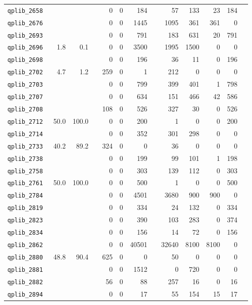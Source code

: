 {\begin{longtable}{lrrrrrrrrrrrr}
{\tt 	qplib\_2658	}	&		&		&	&	0	&	0	&	184	&	&	57	&	133	&	23	&	184	\\
{\tt 	qplib\_2676	}	&		&		&	&	0	&	0	&	1445	&	&	1095	&	361	&	361	&	0	\\
{\tt 	qplib\_2693	}	&		&		&	&	0	&	0	&	791	&	&	183	&	631	&	20	&	791	\\
{\tt 	qplib\_2696	}	&	1.8	&	0.1	&	&	0	&	0	&	3500	&	&	1995	&	1500	&	0	&	0	\\
{\tt 	qplib\_2698	}	&		&		&	&	0	&	0	&	196	&	&	36	&	11	&	0	&	196	\\
{\tt 	qplib\_2702	}	&	4.7	&	1.2	&	&	259	&	0	&	1	&	&	212	&	0	&	0	&	0	\\
{\tt 	qplib\_2703	}	&		&		&	&	0	&	0	&	799	&	&	399	&	401	&	1	&	798	\\
{\tt 	qplib\_2707	}	&		&		&	&	0	&	0	&	634	&	&	151	&	466	&	42	&	586	\\
{\tt 	qplib\_2708	}	&		&		&	&	108	&	0	&	526	&	&	327	&	30	&	0	&	526	\\
{\tt 	qplib\_2712	}	&	50.0	&	100.0	&	&	0	&	0	&	200	&	&	1	&	0	&	0	&	200	\\
{\tt 	qplib\_2714	}	&		&		&	&	0	&	0	&	352	&	&	301	&	298	&	0	&	0	\\
{\tt 	qplib\_2733	}	&	40.2	&	89.2	&	&	324	&	0	&	0	&	&	36	&	0	&	0	&	0	\\
{\tt 	qplib\_2738	}	&		&		&	&	0	&	0	&	199	&	&	99	&	101	&	1	&	198	\\
{\tt 	qplib\_2758	}	&		&		&	&	0	&	0	&	303	&	&	139	&	112	&	0	&	303	\\
{\tt 	qplib\_2761	}	&	50.0	&	100.0	&	&	0	&	0	&	500	&	&	1	&	0	&	0	&	500	\\
{\tt 	qplib\_2784	}	&		&		&	&	0	&	0	&	4501	&	&	3680	&	900	&	900	&	0	\\
{\tt 	qplib\_2819	}	&		&		&	&	0	&	0	&	334	&	&	24	&	132	&	0	&	334	\\
{\tt 	qplib\_2823	}	&		&		&	&	0	&	0	&	390	&	&	103	&	283	&	0	&	374	\\
{\tt 	qplib\_2834	}	&		&		&	&	0	&	0	&	156	&	&	14	&	72	&	0	&	156	\\
{\tt 	qplib\_2862	}	&		&		&	&	0	&	0	&	40501	&	&	32640	&	8100	&	8100	&	0	\\
{\tt 	qplib\_2880	}	&	48.8	&	90.4	&	&	625	&	0	&	0	&	&	50	&	0	&	0	&	0	\\
{\tt 	qplib\_2881	}	&		&		&	&	0	&	0	&	1512	&	&	0	&	720	&	0	&	0	\\
{\tt 	qplib\_2882	}	&		&		&	&	56	&	0	&	88	&	&	257	&	16	&	0	&	16	\\
{\tt 	qplib\_2894	}	&		&		&	&	0	&	0	&	17	&	&	55	&	154	&	15	&	17	\\

\end{longtable}}
